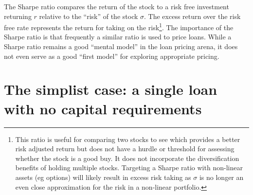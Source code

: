 \documentclass{article}
\begin{document}
The Sharpe ratio compares the return of the stock to a risk free investment returning \(r\) relative to the ``risk'' of the stock \(\sigma\).  The excess return over the risk free rate represents the return for taking on the risk\footnote{This ratio is useful for comparing two stocks to see which provides a better risk adjusted return but does not have a hurdle or threshold for assessing whether the stock is a good buy.  It does not incorporate the diversification benefits of holding multiple stocks.  Targeting a Sharpe ratio with non-linear assets (eg options) will likely result in excess risk taking as \(\sigma\) is no longer an even close approximation for the risk in a non-linear portfolio.}.  The importance of the Sharpe ratio is that frequently a similar ratio is used to price loans.  While a Sharpe ratio remains a good ``mental model'' in the loan pricing arena, it does not even serve as a good ``first model'' for exploring appropriate pricing.


\section{The simplist case: a single loan with no capital requirements}
\end{document}
